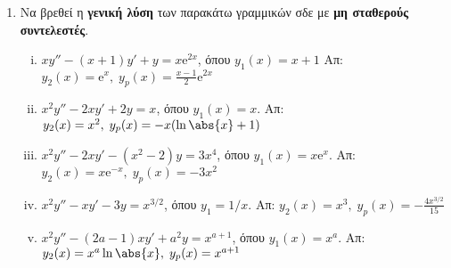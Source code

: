 \begin{enumerate}
  \item Να βρεθεί η \textbf{γενική λύση} των παρακάτω γραμμικών σδε με \textbf{μη
    σταθερούς συντελεστές}.

    \begin{enumerate}[i)] %
      \item $ xy''-(x+1)y'+y=x \mathrm{e}^{2x} $, όπου $ y_{1}(x)= x+1 $
        \hfill Απ: $ y_{2}(x) = \mathrm{e}^{x} , \; y_{p}(x)= \frac{x-1}{2}
        \mathrm{e}^{2x} $ 

      \item $ x^{2}y''-2xy'+2y=x $, όπου $ y_{1}(x) = x $. 
        \hfill Απ: $ y_{2}(x) = x^{2}, \; y_{p}(x) = -x(\ln{\abs{x}} +1) $ 

      \item $ x^{2}y''-2xy'-(x^{2}-2)y=3x^{4} $, όπου $ y_{1}(x)=x \mathrm{e}^{x} $.
       \hfill Απ: $ y_{2}(x)=x \mathrm{e}^{-x} , \; y_{p}(x)=-3 x^{2} $ 

     \item $ x^{2}y''-xy'-3y=x^{3/2} $, όπου $ y_{1}= {1}/{x} $. 
       \hfill Απ: $ y_{2}(x)=x^{3}, \; y_{p}(x) = - \frac{4x^{3/2}}{15} $ 

     \item $ x^{2}y''-(2a-1)xy'+a^{2}y=x^{a+1} $, όπου $ y_{1}(x)=x^{a} $.
       \hfill Απ: $ y_{2}(x)=x^{a} \ln{\abs{x}} , \; y_{p}(x) = x^{a+1} $ 
    \end{enumerate}
\end{enumerate}




